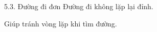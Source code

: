 \documentclass{beamer}
\begin{document}
\begin{frame}{5.3. Đường đi đơn}
\Large
Đường đi không lặp lại đỉnh.

\vspace{0.3cm}
Giúp tránh vòng lặp khi tìm đường.
\end{frame}
\end{document}
